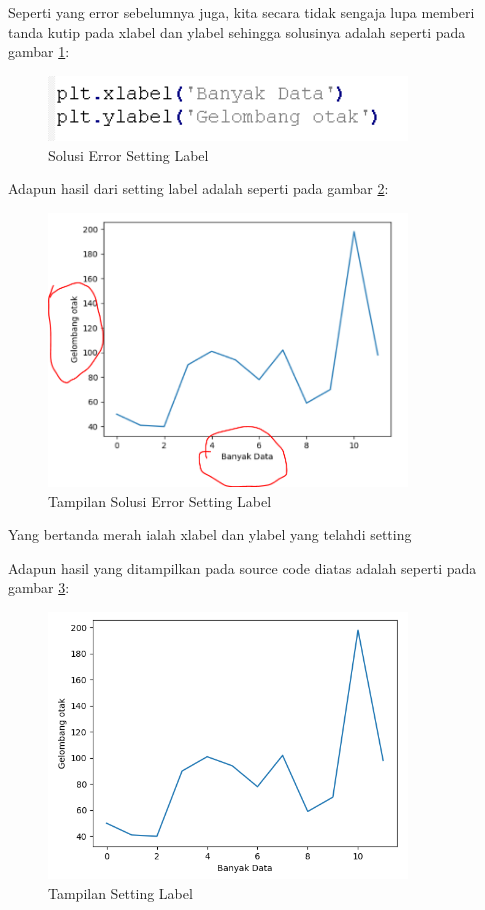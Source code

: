 Seperti yang error sebelumnya juga, kita secara tidak sengaja lupa memberi tanda kutip pada xlabel dan ylabel sehingga solusinya adalah seperti pada gambar \ref{fig:solesl}:
\begin{figure}[!htbp]
	\centerline{\includegraphics[width=0.85\textwidth]{figures/6/solesl.PNG}}
	\caption{Solusi Error Setting Label}
	\label{fig:solesl}
\end{figure}  

Adapun hasil dari setting label adalah seperti pada gambar \ref{fig:showtsesl}:
\begin{figure}[!htbp]
	\centerline{\includegraphics[width=0.85\textwidth]{figures/6/showtsesl.PNG}}
	\caption{Tampilan Solusi Error Setting Label}
	\label{fig:showtsesl}
\end{figure}   
Yang bertanda merah ialah xlabel dan ylabel yang telahdi setting

Adapun hasil yang ditampilkan pada source code diatas adalah seperti pada gambar \ref{fig:showsl}:
\begin{figure}[!htbp]
	\centerline{\includegraphics[width=0.85\textwidth]{figures/6/showsl.PNG}}
	\caption{Tampilan Setting Label}
	\label{fig:showsl}
\end{figure}   

